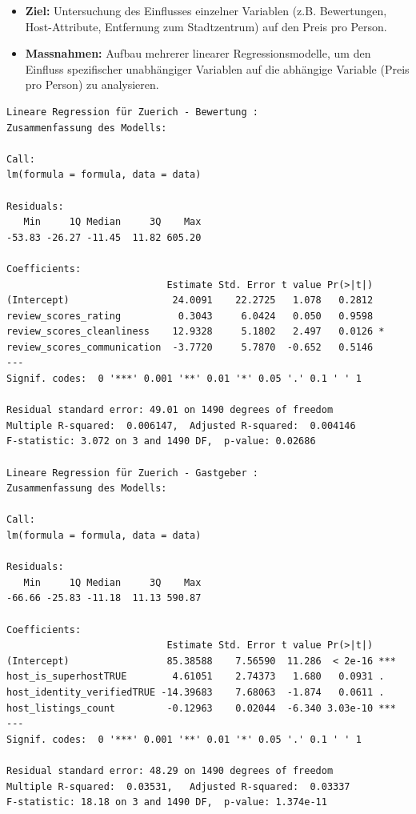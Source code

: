 \documentclass[
  journal,
]{IEEEtran}%
\begin{document}
\begin{itemize}
\item
  \textbf{Ziel:} Untersuchung des Einflusses einzelner Variablen (z.B.
  Bewertungen, Host-Attribute, Entfernung zum Stadtzentrum) auf den
  Preis pro Person.
\item
  \textbf{Massnahmen:} Aufbau mehrerer linearer Regressionsmodelle, um
  den Einfluss spezifischer unabhängiger Variablen auf die abhängige
  Variable (Preis pro Person) zu analysieren.
\end{itemize}

\begin{verbatim}
Lineare Regression für Zuerich - Bewertung :
Zusammenfassung des Modells:

Call:
lm(formula = formula, data = data)

Residuals:
   Min     1Q Median     3Q    Max 
-53.83 -26.27 -11.45  11.82 605.20 

Coefficients:
                            Estimate Std. Error t value Pr(>|t|)  
(Intercept)                  24.0091    22.2725   1.078   0.2812  
review_scores_rating          0.3043     6.0424   0.050   0.9598  
review_scores_cleanliness    12.9328     5.1802   2.497   0.0126 *
review_scores_communication  -3.7720     5.7870  -0.652   0.5146  
---
Signif. codes:  0 '***' 0.001 '**' 0.01 '*' 0.05 '.' 0.1 ' ' 1

Residual standard error: 49.01 on 1490 degrees of freedom
Multiple R-squared:  0.006147,  Adjusted R-squared:  0.004146 
F-statistic: 3.072 on 3 and 1490 DF,  p-value: 0.02686

Lineare Regression für Zuerich - Gastgeber :
Zusammenfassung des Modells:

Call:
lm(formula = formula, data = data)

Residuals:
   Min     1Q Median     3Q    Max 
-66.66 -25.83 -11.18  11.13 590.87 

Coefficients:
                            Estimate Std. Error t value Pr(>|t|)    
(Intercept)                 85.38588    7.56590  11.286  < 2e-16 ***
host_is_superhostTRUE        4.61051    2.74373   1.680   0.0931 .  
host_identity_verifiedTRUE -14.39683    7.68063  -1.874   0.0611 .  
host_listings_count         -0.12963    0.02044  -6.340 3.03e-10 ***
---
Signif. codes:  0 '***' 0.001 '**' 0.01 '*' 0.05 '.' 0.1 ' ' 1

Residual standard error: 48.29 on 1490 degrees of freedom
Multiple R-squared:  0.03531,   Adjusted R-squared:  0.03337 
F-statistic: 18.18 on 3 and 1490 DF,  p-value: 1.374e-11


\end{verbatim}
\end{document}
